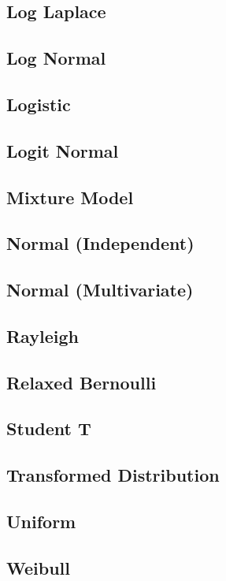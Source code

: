 \subsection{Log Laplace}
\subsection{Log Normal}
\subsection{Logistic}
\subsection{Logit Normal}
\subsection{Mixture Model}
\subsection{Normal (Independent)}
\subsection{Normal (Multivariate)}
\subsection{Rayleigh}
\subsection{Relaxed Bernoulli}
\subsection{Student T}
\subsection{Transformed Distribution}
\subsection{Uniform}
\subsection{Weibull}
